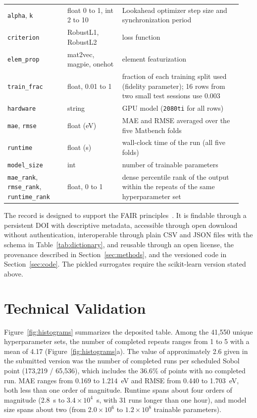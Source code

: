 \documentclass[pdflatex,sn-mathphys-num]{sn-jnl}
\begin{document}
\begin{table}[h]
\begin{tabular}{@{}p{0.24\linewidth}p{0.22\linewidth}p{0.48\linewidth}@{}}
\texttt{alpha}, \texttt{k} & float 0 to 1, int 2 to 10 & Lookahead optimizer step size and synchronization period \\
\texttt{criterion} & RobustL1, RobustL2 & loss function \\
\texttt{elem\_prop} & mat2vec, magpie, onehot & element featurization \\
\texttt{train\_frac} & float, 0.01 to 1 & fraction of each training split used (fidelity parameter); 16 rows from two small test sessions use 0.003 \\
\texttt{hardware} & string & GPU model (\texttt{2080ti} for all rows) \\
\texttt{mae}, \texttt{rmse} & float (eV) & MAE and RMSE averaged over the five Matbench folds \\
\texttt{runtime} & float (s) & wall-clock time of the run (all five folds) \\
\texttt{model\_size} & int & number of trainable parameters \\
\texttt{mae\_rank}, \texttt{rmse\_rank}, \texttt{runtime\_rank} & float, 0 to 1 & dense percentile rank of the output within the repeats of the same hyperparameter set \\
\bottomrule
\end{tabular}
\end{table}

The record is designed to support the FAIR principles~\cite{Wilkinson2016_FAIR}. It is findable through a persistent DOI with descriptive metadata, accessible through open download without authentication, interoperable through plain CSV and JSON files with the schema in Table~\ref{tab:dictionary}, and reusable through an open license, the provenance described in Section~\ref{sec:methods}, and the versioned code in Section~\ref{sec:code}. The pickled surrogates require the scikit-learn version stated above.

\section{Technical Validation}\label{sec:tech-validation}

Figure~\ref{fig:histograms} summarizes the deposited table. Among the 41,550 unique hyperparameter sets, the number of completed repeats ranges from 1 to 5 with a mean of 4.17 (Figure~\ref{fig:histograms}a). The value of approximately 2.6 given in the submitted version was the number of completed runs per scheduled Sobol point (173,219 / 65,536), which includes the 36.6\% of points with no completed run. MAE ranges from 0.169 to 1.214~eV and RMSE from 0.440 to 1.703~eV, both less than one order of magnitude. Runtime spans about four orders of magnitude (2.8~s to $3.4\times10^{4}$~s, with 31 runs longer than one hour), and model size spans about two (from $2.0\times10^{6}$ to $1.2\times10^{8}$ trainable parameters).
\end{document}
